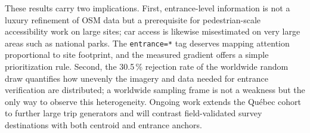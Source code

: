 \documentclass{osmscience}
\begin{document}
These results carry two implications. First, entrance-level information is not a luxury refinement of OSM data but a prerequisite for pedestrian-scale accessibility work on large sites; car access is likewise misestimated on very large areas such as national parks. The \texttt{entrance=*} tag deserves mapping attention proportional to site footprint, and the measured gradient offers a simple prioritization rule. Second, the 30.5\,\% rejection rate of the worldwide random draw quantifies how unevenly the imagery and data needed for entrance verification are distributed; a worldwide sampling frame is not a weakness but the only way to observe this heterogeneity. Ongoing work extends the Québec cohort to further large trip generators and will contrast field-validated survey destinations \cite{Bourbonnais2026} with both centroid and entrance anchors.

\printbibliography
\end{document}
